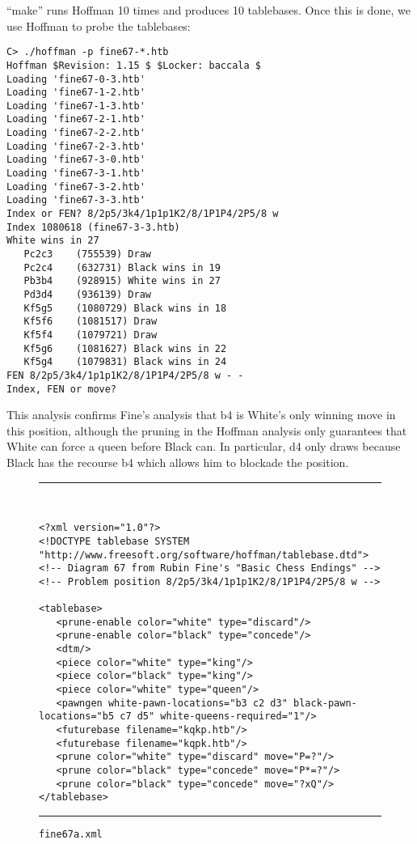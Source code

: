 \documentclass[11pt]{article}
\begin{document}
``make'' runs Hoffman 10 times and produces 10
tablebases.  Once this is done, we use Hoffman to probe the tablebases:

\begin{verbatim}
C> ./hoffman -p fine67-*.htb
Hoffman $Revision: 1.15 $ $Locker: baccala $
Loading 'fine67-0-3.htb'
Loading 'fine67-1-2.htb'
Loading 'fine67-1-3.htb'
Loading 'fine67-2-1.htb'
Loading 'fine67-2-2.htb'
Loading 'fine67-2-3.htb'
Loading 'fine67-3-0.htb'
Loading 'fine67-3-1.htb'
Loading 'fine67-3-2.htb'
Loading 'fine67-3-3.htb'
Index or FEN? 8/2p5/3k4/1p1p1K2/8/1P1P4/2P5/8 w
Index 1080618 (fine67-3-3.htb)
White wins in 27
   Pc2c3    (755539) Draw
   Pc2c4    (632731) Black wins in 19
   Pb3b4    (928915) White wins in 27
   Pd3d4    (936139) Draw
   Kf5g5    (1080729) Black wins in 18
   Kf5f6    (1081517) Draw
   Kf5f4    (1079721) Draw
   Kf5g6    (1081627) Black wins in 22
   Kf5g4    (1079831) Black wins in 24
FEN 8/2p5/3k4/1p1p1K2/8/1P1P4/2P5/8 w - -
Index, FEN or move?
\end{verbatim}

This analysis confirms Fine's analysis that b4 is White's only winning
move in this position, although the pruning in the Hoffman analysis
only guarantees that White can force a queen before Black can.  In
particular, d4 only draws because Black has the recourse b4 which
allows him to blockade the position.

\begin{figure}
\hrule\ 
{\small\begin{verbatim}
<?xml version="1.0"?>
<!DOCTYPE tablebase SYSTEM "http://www.freesoft.org/software/hoffman/tablebase.dtd">
<!-- Diagram 67 from Rubin Fine's "Basic Chess Endings" -->
<!-- Problem position 8/2p5/3k4/1p1p1K2/8/1P1P4/2P5/8 w -->

<tablebase>
   <prune-enable color="white" type="discard"/>
   <prune-enable color="black" type="concede"/>
   <dtm/>
   <piece color="white" type="king"/>
   <piece color="black" type="king"/>
   <piece color="white" type="queen"/>
   <pawngen white-pawn-locations="b3 c2 d3" black-pawn-locations="b5 c7 d5" white-queens-required="1"/>
   <futurebase filename="kqkp.htb"/>
   <futurebase filename="kqpk.htb"/>
   <prune color="white" type="discard" move="P=?"/>
   <prune color="black" type="concede" move="P*=?"/>
   <prune color="black" type="concede" move="?xQ"/>
</tablebase>
\end{verbatim}}
\hrule
\caption{\tt fine67a.xml}
\end{figure}
\end{document}
